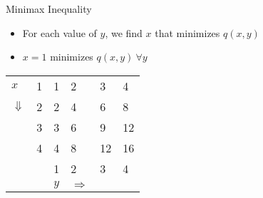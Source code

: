 \documentclass[xcolor=table]{beamer}
\begin{document}
 
        \begin{frame}{Minimax Inequality}
            \begin{itemize}[<+->]
                \item For each value of $y$, we find $x$ that minimizes $q(x, y)$ 
                \item $x=1$ minimizes $q(x, y) ~\forall y$
            \end{itemize}
            
            \begin{table}[]
                \begin{tabular}{llllll}
                \cline{2-2}
                \multicolumn{1}{l|}{$x$}          & \multicolumn{1}{l|}{1} & \cellcolor[HTML]{FFCE93}1 & \cellcolor[HTML]{FFCE93}2 & \cellcolor[HTML]{FFCE93}3 & \cellcolor[HTML]{FFCE93}4 \\ \cline{2-2}
                \multicolumn{1}{l|}{$\Downarrow$} & \multicolumn{1}{l|}{2} & 2                         & 4                         & 6                         & 8                         \\ \cline{2-2}
                \multicolumn{1}{l|}{}             & \multicolumn{1}{l|}{3} & 3                         & 6                         & 9                         & 12                        \\ \cline{2-2}
                \multicolumn{1}{l|}{}             & \multicolumn{1}{l|}{4} & 4                         & 8                         & 12                        & 16                        \\ \cline{2-6} 
                \multicolumn{1}{l|}{}             & \multicolumn{1}{l|}{}  & \multicolumn{1}{l|}{1}    & \multicolumn{1}{l|}{2}    & \multicolumn{1}{l|}{3}    & \multicolumn{1}{l|}{4}    \\ \cline{2-6} 
                                                  &                        & $y$                 & $\Rightarrow$              &                           &                          
                \end{tabular}
                \end{table}
        
            \end{frame}
    
\end{document}
